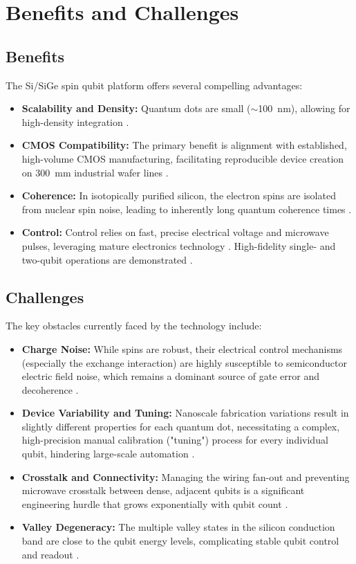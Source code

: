 \section{Benefits and Challenges}

\subsection{Benefits}
The Si/SiGe spin qubit platform offers several compelling advantages:
\begin{itemize}
    \item \textbf{Scalability and Density:} Quantum dots are small ($\sim$100~nm), allowing for high-density integration \cite{ref2, ref9}.
    \item \textbf{CMOS Compatibility:} The primary benefit is alignment with established, high-volume CMOS manufacturing, facilitating reproducible device creation on 300~mm industrial wafer lines \cite{ref2, ref5, ref9, ref10}.
    \item \textbf{Coherence:} In isotopically purified silicon, the electron spins are isolated from nuclear spin noise, leading to inherently long quantum coherence times \cite{ref9, ref12}.
    \item \textbf{Control:} Control relies on fast, precise electrical voltage and microwave pulses, leveraging mature electronics technology \cite{ref2, ref7}. High-fidelity single- and two-qubit operations are demonstrated \cite{ref1, ref4, ref9}.
\end{itemize}

\subsection{Challenges}
The key obstacles currently faced by the technology include:
\begin{itemize}
    \item \textbf{Charge Noise:} While spins are robust, their electrical control mechanisms (especially the exchange interaction) are highly susceptible to semiconductor electric field noise, which remains a dominant source of gate error and decoherence \cite{ref4, ref9}.
    \item \textbf{Device Variability and Tuning:} Nanoscale fabrication variations result in slightly different properties for each quantum dot, necessitating a complex, high-precision manual calibration ("tuning") process for every individual qubit, hindering large-scale automation \cite{ref5}.
    \item \textbf{Crosstalk and Connectivity:} Managing the wiring fan-out and preventing microwave crosstalk between dense, adjacent qubits is a significant engineering hurdle that grows exponentially with qubit count \cite{ref2, ref5, ref9, ref11}.
    \item \textbf{Valley Degeneracy:} The multiple valley states in the silicon conduction band are close to the qubit energy levels, complicating stable qubit control and readout \cite{ref2}.
\end{itemize}

